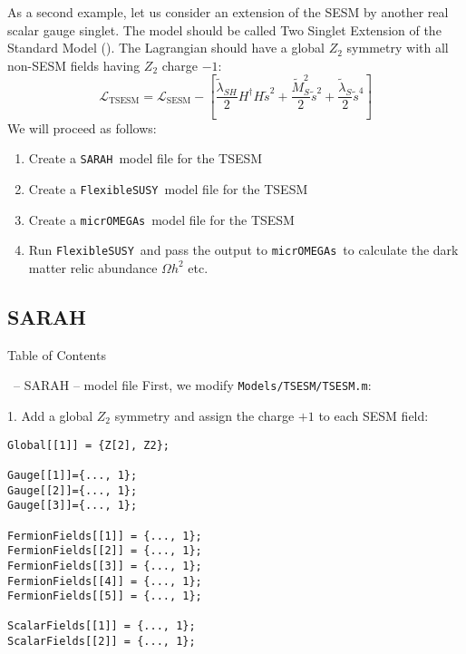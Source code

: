 \documentclass[11pt]{beamer}
\newcommand{\FlexibleSUSY}{\texttt{FlexibleSUSY}}
\newcommand{\Lagr}{\mathcal{L}}
\newcommand{\micrOMEGAs}{\texttt{micrOMEGAs}}
\newcommand{\SARAH}{\texttt{SARAH}}
\newcommand{\SESM}{\text{SESM}}
\newcommand{\TSESM}{\text{TSESM}}
\begin{document}
\begin{frame}{\insertsection}
  As a second example, let us consider an extension of the SESM by
  another real scalar gauge singlet. The model should be called Two
  Singlet Extension of the Standard Model (\TSESM). The Lagrangian
  should have a global $Z_2$ symmetry with all non-SESM fields having
  $Z_2$ charge $-1$:
  \begin{equation*}
    \Lagr_{\TSESM} = \Lagr_{\SESM} - \left[\frac{\tilde\lambda_{SH}}{2} H^\dagger H \tilde{s}^2 + \frac{\tilde{M}_S^2}{2} \tilde{s}^2 + \frac{\tilde{\lambda}_S}{2} \tilde{s}^4\right]
  \end{equation*}
  We will proceed as follows:
  \begin{enumerate}
  \item Create a \SARAH\ model file for the TSESM
  \item Create a \FlexibleSUSY\ model file for the TSESM
  \item Create a \micrOMEGAs\ model file for the TSESM
  \item Run \FlexibleSUSY\ and pass the output to \micrOMEGAs\ to
    calculate the dark matter relic abundance $\Omega h^2$ etc.
  \end{enumerate}
\end{frame}


\subsection{SARAH}


\begin{frame}{Table of Contents}
\end{frame}


\begin{frame}[fragile]{\insertsection\ -- SARAH -- model file}
  First, we modify \texttt{Models/TSESM/TSESM.m}:

  \medskip

  1. Add a global $Z_2$ symmetry and assign the charge $+1$ to each SESM
  field:
  \begin{lstlisting}
Global[[1]] = {Z[2], Z2};

Gauge[[1]]={..., 1};
Gauge[[2]]={..., 1};
Gauge[[3]]={..., 1};

FermionFields[[1]] = {..., 1};
FermionFields[[2]] = {..., 1};
FermionFields[[3]] = {..., 1};
FermionFields[[4]] = {..., 1};
FermionFields[[5]] = {..., 1};

ScalarFields[[1]] = {..., 1};
ScalarFields[[2]] = {..., 1};\end{lstlisting}
\end{frame}
\end{document}
